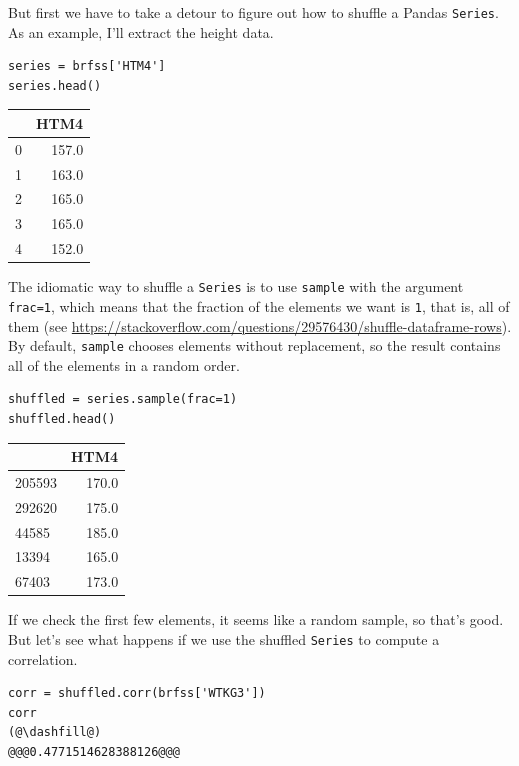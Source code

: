 But first we have to take a detour to figure out how to shuffle a Pandas
\passthrough{\lstinline!Series!}. As an example, I'll extract the height
data.

\begin{lstlisting}[]
series = brfss['HTM4']
series.head()
\end{lstlisting}

\begin{tabular}{lr}
\midrule
{} &   HTM4 \\
\midrule
0 &  157.0 \\
1 &  163.0 \\
2 &  165.0 \\
3 &  165.0 \\
4 &  152.0 \\
\midrule
\end{tabular}

The idiomatic way to shuffle a \passthrough{\lstinline!Series!} is to
use \passthrough{\lstinline!sample!} with the argument
\passthrough{\lstinline!frac=1!}, which means that the fraction of the
elements we want is \passthrough{\lstinline!1!}, that is, all of them
(see
\url{https://stackoverflow.com/questions/29576430/shuffle-dataframe-rows}).
By default, \passthrough{\lstinline!sample!} chooses elements without
replacement, so the result contains all of the elements in a random
order.

\begin{lstlisting}[]
shuffled = series.sample(frac=1)
shuffled.head()
\end{lstlisting}

\begin{tabular}{lr}
\midrule
{} &   HTM4 \\
\midrule
205593 &  170.0 \\
292620 &  175.0 \\
44585  &  185.0 \\
13394  &  165.0 \\
67403  &  173.0 \\
\midrule
\end{tabular}

If we check the first few elements, it seems like a random sample, so
that's good. But let's see what happens if we use the shuffled
\passthrough{\lstinline!Series!} to compute a correlation.

\begin{lstlisting}[]
corr = shuffled.corr(brfss['WTKG3'])
corr
(@\dashfill@)
@@@0.4771514628388126@@@
\end{lstlisting}


